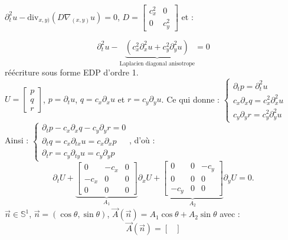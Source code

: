 \documentclass[12pt,a4paper]{article}
\begin{document}
	\begin{ex}$ $\\
		\begin{minipage}{17cm}
			$\partial_t^2u-\mathrm{div}_{x,y)}\left(D\nabla_{(x,y)}u\right) = 0$, $D= \begin{bmatrix}
				c_x^2 & 0 \\
				0 & c_y^2
			\end{bmatrix}$ et :
		\end{minipage}
		\begin{minipage}{17cm}
			\[
			\partial_t^2 u - \underbrace{(c_x^2\partial_x^2u+c_y^2\partial_y^2 u)}_{\text{Laplacien diagonal anisotrope}} = 0
			\]
			réécriture sous forme EDP d'ordre 1.\\
			$U = \begin{bmatrix}
				p \\
				q \\
				r
			\end{bmatrix}$, $p = \partial_t u$, $q = c_x \partial_x u$ et $r = c_y \partial_y u$. Ce qui donne : $\begin{cases}
				\partial_t p = \partial_t^2 u\\
				c_x \partial_x q = c_x^2 \partial_x^2 u\\
				c_y\partial_y r = c_y^2 \partial_y^2 u
			\end{cases}$\\
			Ainsi : $\begin{cases}
				\partial_t p - c_x \partial_x q - c_y \partial_y r = 0\\
				\partial_t q = c_x \partial_{tx} u = c_x \partial_x p\\
				\partial_t r = c_y \partial_{ty} u = c_y \partial_y p
			\end{cases}$, d'où :
			\[
			\partial_t U + \underbrace{\begin{bmatrix}
					0 & -c_x & 0 \\
					-c_x & 0 & 0 \\
					0 & 0 & 0
			\end{bmatrix}}_{A_1}\partial_x U + \underbrace{\begin{bmatrix}
					0 & 0 & -c_y \\
					0 & 0 & 0 \\
					-c_y & 0 & 0
			\end{bmatrix}}_{A_2}\partial_y U = 0.
			\]
			$\vec n \in \mathbb{S}^1$, $\vec n = (\cos \theta,\sin\theta)$, $\vec A(\vec n) = A_1\cos\theta+A_2\sin\theta$ avec :
			\[
			\vec A(\vec n) = \begin{bmatrix}

\end{bmatrix}\]
\end{minipage}
\end{ex}
\end{document}
